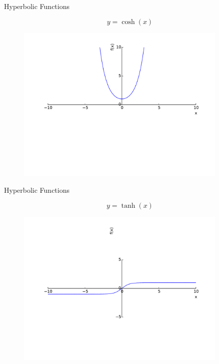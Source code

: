 \documentclass[10pt]{beamer}
\begin{document}
\begin{frame}{Hyperbolic Functions}

	\begin{equation*}
		y = \cosh(x)
	\end{equation*}

	\begin{figure}
		\includegraphics[width=0.9\textwidth]{beamer-pics/hyperbolics-2.pdf}
	\end{figure}

\end{frame}

\begin{frame}{Hyperbolic Functions}

	\begin{equation*}
		y = \tanh(x)
	\end{equation*}

	\begin{figure}
		\includegraphics[width=0.9\textwidth]{beamer-pics/hyperbolics-3.pdf}
	\end{figure}

\end{frame}
\end{document}
